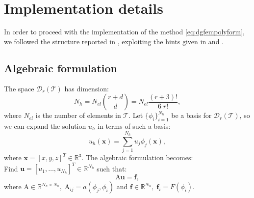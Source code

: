 \documentclass[12pt, a4paper]{article}
\theoremstyle{definition}
\theoremstyle{plain}
\theoremstyle{plain}
\theoremstyle{definition}
\begin{document}
\section{Implementation details}\label{sec:imp}
In order to proceed with the implementation of the method 
\eqref{eq:dgfempolyform}, we followed the structure reported in \cite{riviere}, 
exploiting the hints given in \cite{hpmet} and \cite{hest}.
\subsection{Algebraic formulation}
The space $\mathcal{D}_r(\mathcal{T})$ has dimension:
\begin{equation*}
	N_h = N_{el} \binom{r+d}{d} = N_{el} \frac{(r+3)!}{6\;r!},
\end{equation*}
where $N_{el}$ is the number of elements in $\mathcal{T}$. Let $\{ \phi_i 
\}^{N_h}_{i=1}$ be a basis for $\mathcal{D}_r(\mathcal{T})$, so we can expand 
the solution $u_h$ in terms of such a basis:
\begin{equation*}
	u_h(\mathbf{x}) = \sum_{j = 1}^{N_h} u_j \phi_j(\mathbf{x}),
\end{equation*}
where $\mathbf{x}=[x, y, z]^T \in \mathbb{R}^3$. The algebraic formulation 
becomes:\\
Find $\mathbf{u} = [u_1, \dots, u_{N_h}]^T \in \mathbb{R}^{N_h} $ such that:
\begin{equation*}
	\mathrm{A}\mathbf{u} = \mathbf{f},
\end{equation*}
where $\mathrm{A} \in \mathbb{R}^{N_h \times N_h}, \; \mathrm{A}_{ij} = a(\phi_j, \phi_i)$ and $\mathbf{f} \in \mathbb{R}^{N_h}, \; \mathbf{f}_i = F(\phi_i)$.
\end{document}
